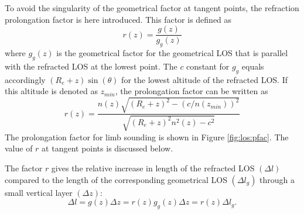  
  To avoid the singularity of the geometrical factor at tangent points,
  the refraction prolongation factor is here introduced. This factor is 
  defined as
  \begin{equation}
    r(z) = \frac {g(z)} {g_g(z)}
   \label{eq:los:refprol1}
  \end{equation}
  where $g_g(z)$ is the geometrical factor for the geometrical LOS
  that is parallel with the refracted LOS at the lowest point. The
  $c$ constant for $g_g$ equals accordingly $(R_e+z)\sin(\theta)$ for
  the lowest altitude of the refracted LOS. If this altitude is
  denoted as $z_{min}$, the prolongation factor can be written as
  \begin{equation}
    r(z) = \frac {n(z)\sqrt{ (R_e+z)^2 - (c/n(z_{min}))^2 }} 
                 {\sqrt{ (R_e+z)^2n^2(z) - c^2 }}
   \label{eq:los:refprol2}
  \end{equation}
  The prolongation factor for limb sounding is shown in Figure 
  \ref{fig:los:pfac}.
  The value of $r$ at tangent points is discussed below.

  The factor $r$ gives the relative increase in length of the
  refracted LOS $(\Delta l)$ compared to the length of the corresponding
  geometrical LOS $(\Delta l_g)$ through a small vertical layer $(\Delta z)$:
  \begin{equation}
    \Delta l = g(z) \Delta z = r(z) g_g(z) \Delta z = r(z) \Delta l_g.
   \label{eq:los:refprol3}
  \end{equation}

